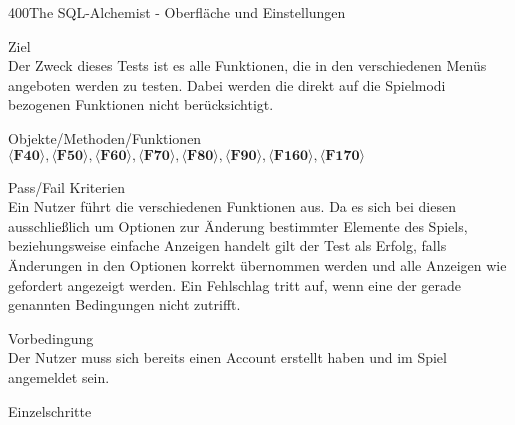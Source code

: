 \begin{testcase}{400}{The SQL-Alchemist - Oberfläche und Einstellungen}

\item[Ziel]~\\
Der Zweck dieses Tests ist es alle Funktionen, die in den verschiedenen Menüs angeboten werden zu testen. Dabei werden die direkt auf die Spielmodi bezogenen Funktionen nicht berücksichtigt.

\item[Objekte/Methoden/Funktionen]~\\
$\langle\textbf{F40}\rangle, \langle\textbf{F50}\rangle, \langle\textbf{F60}\rangle, \langle\textbf{F70}\rangle, \langle\textbf{F80}\rangle, \langle\textbf{F90}\rangle, \langle\textbf{F160}\rangle, \langle\textbf{F170}\rangle$ 

\item[Pass/Fail Kriterien]~\\
Ein Nutzer führt die verschiedenen Funktionen aus. Da es sich bei diesen ausschließlich um Optionen zur Änderung bestimmter Elemente des Spiels, beziehungsweise einfache Anzeigen handelt gilt der Test als Erfolg, falls Änderungen in den Optionen korrekt übernommen werden und alle Anzeigen wie gefordert angezeigt werden. Ein Fehlschlag tritt auf, wenn eine der gerade genannten Bedingungen nicht zutrifft.

\item[Vorbedingung]~\\
Der Nutzer muss sich bereits einen Account erstellt haben und im Spiel angemeldet sein.

\item[Einzelschritte]~\\


\end{testcase}
